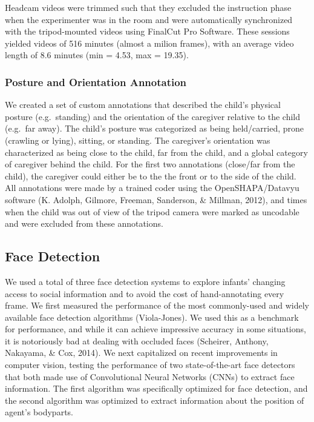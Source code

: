 \documentclass[10pt, letterpaper]{article}
\begin{document}
Headcam videos were trimmed such that they excluded the instruction
phase when the experimenter was in the room and were automatically
synchronized with the tripod-mounted videos using FinalCut Pro Software.
These sessions yielded videos of 516 minutes (almost a milion frames),
with an average video length of 8.6 minutes (min = 4.53, max = 19.35).

\subsubsection{Posture and Orientation
Annotation}\label{posture-and-orientation-annotation}

We created a set of custom annotations that described the child's
physical posture (e.g.~standing) and the orientation of the caregiver
relative to the child (e.g.~far away). The child's posture was
categorized as being held/carried, prone (crawling or lying), sitting,
or standing. The caregiver's orientation was characterized as being
close to the child, far from the child, and a global category of
caregiver behind the child. For the first two annotations (close/far
from the child), the caregiver could either be to the the front or to
the side of the child. All annotations were made by a trained coder
using the OpenSHAPA/Datavyu software (K. Adolph, Gilmore, Freeman,
Sanderson, \& Millman, 2012), and times when the child was out of view
of the tripod camera were marked as uncodable and were excluded from
these annotations.

\subsection{Face Detection}\label{face-detection}

We used a total of three face detection systems to explore infants'
changing access to social information and to avoid the cost of
hand-annotating every frame. We first measured the performance of the
most commonly-used and widely available face detection algorithms
(Viola-Jones). We used this as a benchmark for performance, and while it
can achieve impressive accuracy in some situations, it is notoriously
bad at dealing with occluded faces (Scheirer, Anthony, Nakayama, \& Cox,
2014). We next capitalized on recent improvements in computer vision,
testing the performance of two state-of-the-art face detectors that both
made use of Convolutional Neural Networks (CNNs) to extract face
information. The first algorithm was specifically optimized for face
detection, and the second algorithm was optimized to extract information
about the position of agent's bodyparts.
\end{document}
